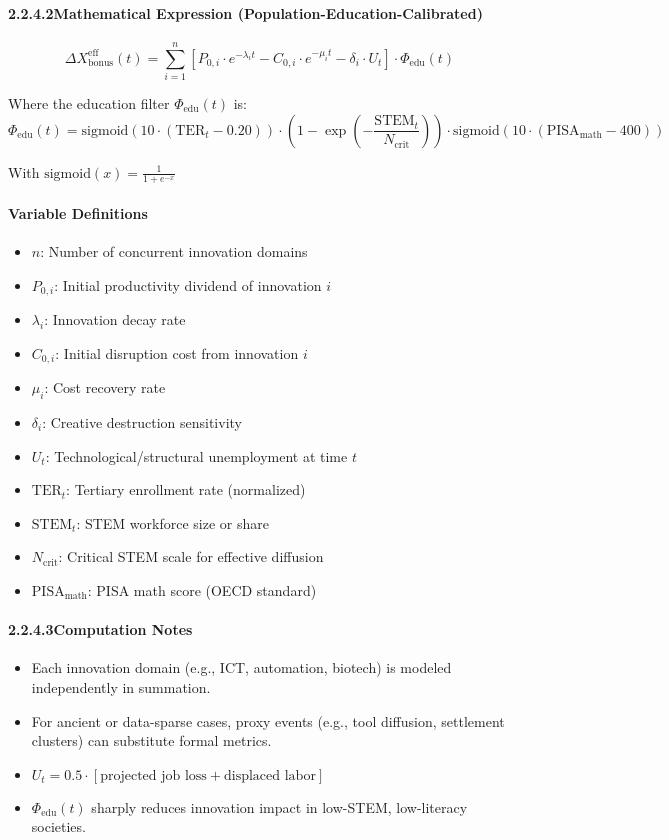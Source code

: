 \documentclass[12pt]{report}
\begin{document}
\paragraph{2.2.4.2\quad Mathematical Expression (Population-Education-Calibrated)}

\[
\Delta X_{\text{bonus}}^{\text{eff}}(t) = \sum_{i=1}^{n} \left[ P_{0,i} \cdot e^{-\lambda_i t} - C_{0,i} \cdot e^{-\mu_i t} - \delta_i \cdot U_t \right] \cdot \Phi_{\text{edu}}(t)
\]

Where the education filter $\Phi_{\text{edu}}(t)$ is:
\[
\Phi_{\text{edu}}(t) = \text{sigmoid}(10 \cdot (\text{TER}_t - 0.20)) \cdot \left(1 - \exp\left(- \frac{\text{STEM}_t}{N_{\text{crit}}} \right) \right) \cdot \text{sigmoid}(10 \cdot (\text{PISA}_{\text{math}} - 400))
\]

With $\text{sigmoid}(x) = \frac{1}{1 + e^{-x}}$

\paragraph{Variable Definitions}
\begin{itemize}
  \item $n$: Number of concurrent innovation domains
  \item $P_{0,i}$: Initial productivity dividend of innovation $i$
  \item $\lambda_i$: Innovation decay rate
  \item $C_{0,i}$: Initial disruption cost from innovation $i$
  \item $\mu_i$: Cost recovery rate
  \item $\delta_i$: Creative destruction sensitivity
  \item $U_t$: Technological/structural unemployment at time $t$
  \item $\text{TER}_t$: Tertiary enrollment rate (normalized)
  \item $\text{STEM}_t$: STEM workforce size or share
  \item $N_{\text{crit}}$: Critical STEM scale for effective diffusion
  \item $\text{PISA}_{\text{math}}$: PISA math score (OECD standard)
\end{itemize}

\paragraph{2.2.4.3\quad Computation Notes}
\begin{itemize}
  \item Each innovation domain (e.g., ICT, automation, biotech) is modeled independently in summation.
  \item For ancient or data-sparse cases, proxy events (e.g., tool diffusion, settlement clusters) can substitute formal metrics.
  \item $U_t = 0.5 \cdot \left[\text{projected job loss} + \text{displaced labor}\right]$
  \item $\Phi_{\text{edu}}(t)$ sharply reduces innovation impact in low-STEM, low-literacy societies.
\end{itemize}
\end{document}
